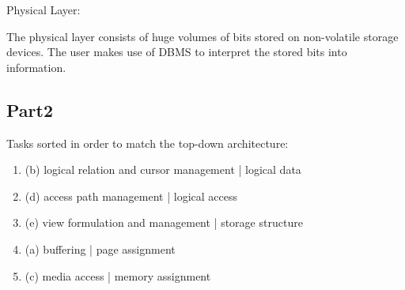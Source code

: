 \documentclass[10pt]{article}
\newcommand{\indentitem}{\setlength\itemindent{25pt}}
\begin{document}
		
		
		Physical Layer:
		
		The physical layer consists of huge volumes of bits stored on non-volatile storage devices. The user makes use of DBMS to interpret the stored bits into information.
		
		\bigskip
		
		\bigskip
		
		\subsection*{Part2}
		
		\iffalse
		Logical Data Structure
		
		Logical Access Structure
		
		Storage Structure
		
		Page Assignment Structure
		
		Memory Assignment Structure
		\fi
		
		Tasks sorted in order to match the top-down architecture:
		
		
		\begin{enumerate}
			\indentitem
			
			\item (b) logical relation and cursor management | logical data		
			
			\item (d) access path management | logical access
			
			\item (e) view formulation and management | storage structure			
			
			\item (a) buffering | page assignment
			
			\item (c) media access | memory assignment
		\end{enumerate}
		
		
		\bigskip
		
		\bigskip
		

		
\end{document}
